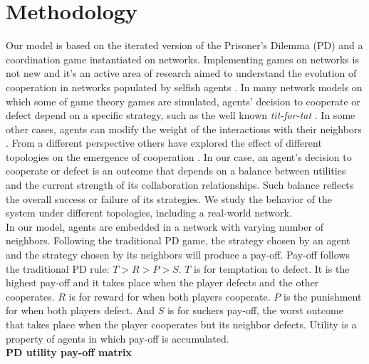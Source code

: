 \documentclass[11pt]{article}
\begin{document}
\section{Methodology}
\label{sec:2}

Our model is based on the iterated version of the Prisoner's Dilemma (PD) and a
coordination game instantiated on
networks. Implementing games on networks is not new and it's an active area of
research aimed to understand the evolution of cooperation in networks populated
by selfish agents \cite{Szabo2007,Nowak1992,Nowak2006,Santos2005,Santos2006}. In many network models
on which some of game theory games are simulated, agents' decision to cooperate
or defect depend on a specific strategy, such as the well known
\textit{tit-for-tat} \cite{Axelrod2006,Nowak2011}. In some other cases, agents
can modify the weight of the interactions with their neighbors
\cite{Santos2006}. From a different perspective others have explored the effect
of different topologies on the emergence of cooperation
\cite{Santos2005,Hauert2004}. {\color{red}In our case, an agent's decision to cooperate or
defect is an outcome that depends on a balance between
utilities and the current strength of its collaboration relationships. Such
balance reflects the overall success or failure of its strategies}. We
study the behavior of the system under different topologies, including a
real-world network.\\  
  

In our model, agents are embedded in a network with varying number of
neighbors. Following the traditional PD game, the strategy chosen by an agent
and the strategy chosen by its neighbors will produce a pay-off. Pay-off follows
the traditional PD rule: $T > R > P > S$. $T$ is for temptation to defect. It is the highest
pay-off and it takes place when the player defects and the other cooperates. $R$
is for reward for when both players cooperate. $P$ is the punishment for when
both players defect. And $S$ is for suckers pay-off, the worst outcome that
takes place when the player cooperates but its neighbor defects. Utility is a
property of agents in which pay-off is accumulated.\\   

{\bf PD utility pay-off matrix}\\
\end{document}

